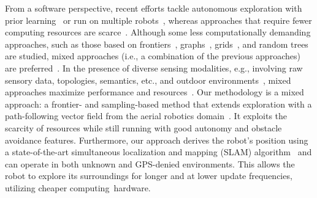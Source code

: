 \documentclass[letterpaper,10pt,conference,twoside]{IEEEtran}
\theoremstyle{definition}
\begin{document}
From a software perspective, 
recent efforts tackle autonomous exploration with prior learning~\cite{shrestha2019learned} or run on multiple robots~\cite{kulkarni2022autonomous,tranzatto2022cerberus,roucek2020darpa}, whereas %
approaches %
that require fewer computing resources are scarce~\cite{bircher2016receding,batinovic2021multi,faisal2021low,muller2021openbot}. 
%
Although some less computationally demanding approaches, such as those based on frontiers~\cite{kim2022autonomous,roucek2020darpa,batinovic2021multi}, graphs~\cite{kulkarni2022autonomous,tranzatto2022cerberus,dang2019graph}, grids~\cite{corah2019communication,tabib2022autonomous}, and random trees are studied, mixed approaches (i.e., a combination of the previous approaches) are preferred~\cite{shrestha2019learned,bircher2016receding,surmann2003autonomous,qiao2019sampling,dai2020fast}. In the presence of diverse sensing modalities, e.g., involving raw sensory data, topologies, semantics, etc., and outdoor environments~\cite{placed2022survey,batinovic2021multi}, mixed approaches %
maximize performance and resources~\cite{placed2022survey,bircher2016receding}. 
%
%
Our methodology is %
a mixed approach: a frontier- and sampling-based method that extends exploration %
with a path-following vector field %
from the aerial robotics domain~\cite{seewald2022energy,garcia2017guidance,seewaldphdthesis}. It
exploits the scarcity of resources while still running %
with good autonomy and obstacle avoidance features. %
%
Furthermore, our %
approach derives the 
robot's 
position using a state-of-the-art 
simultaneous localization and mapping (SLAM) %
algorithm~\cite{labbe2019rtab} and %
can operate in both unknown and GPS-denied environments. 
This allows the robot to explore its surroundings for longer and at lower update frequencies, %
utilizing cheaper computing~hardware. %
\end{document}
